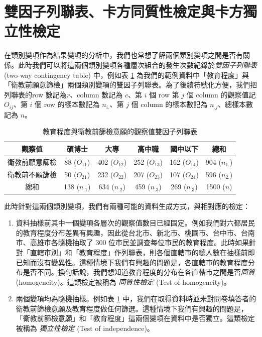 \section{雙因子列聯表、卡方同質性檢定與卡方獨立性檢定}

    在類別變項作為結果變項的分析中，我們也常想了解兩個類別變項之間是否有關係。此時我們可以將這兩個類別變項各種層次組合的發生次數紀錄於\textit{雙因子列聯表} (two-way contingency table) 中，例如表 \ref{tab:two_way_contingency_obs} 為我們的範例資料中「教育程度」與「衛教前願意篩檢」兩個類別變項的雙因子列聯表。為了後續符號化方便，我們把列聯表的row 數記為$r$、column 數記為 $c$、第 $i$ 個 row 第 $j$ 個 column 的觀察值記 $O_{ij}$、第 $i$ 個 row 的樣本數記為 $n_{i.}$、第 $j$ 個 column 的樣本數記為 $n_{.j}$、總樣本數記為 $n$。

    \begin{table}[htbp]
        \begin{center}
            \begin{tabular}{c|cccc|c}
                \toprule
                觀察值 & 碩博士 & 大專 & 高中職 & 國中以下 & 總和\\
                \hline
                衛教前願意篩檢 & 88 ($O_{11}$) & 402 ($O_{12}$) & 252 ($O_{13}$) & 162 ($O_{14}$) & 904 ($n_{1.}$)\\
                衛教前不願篩檢 & 50 ($O_{21}$) & 232 ($O_{22}$) & 207 ($O_{23}$) & 107 ($O_{24}$) & 596 ($n_{2.}$)\\
                \hline
                總和 & 138 ($n_{.1}$) & 634 ($n_{.2}$) & 459 ($n_{.3}$) & 269 ($n_{.3}$) & 1500 ($n$)\\
                \bottomrule
            \end{tabular}
            \caption{教育程度與衛教前篩檢意願的觀察值雙因子列聯表\label{tab:two_way_contingency_obs}}
        \end{center}
    \end{table}
    此時針對這兩個類別變項，我們有兩種可能的資料生成方式，與相對應的檢定：
    \begin{enumerate}
        \item 資料抽樣前其中一個變項各層次的觀察值數目已經固定。例如我們對六都居民的教育程度分布差異有興趣，因此從台北市、新北市、桃園市、台中市、台南市、高雄市各隨機抽取了 300 位市民並調查每位市民的教育程度。此時如果針對「直轄市別」和「教育程度」作列聯表，則各個直轄市的總人數在抽樣前即已知而沒有變異性。這種情境下我們有興趣的問題是，各直轄市的教育程度分布是否不同。換句話說，我們想知道教育程度的分布在各直轄市之間是否\textit{同質} (homogeneity)。這類檢定被稱為 \textit{同質性檢定} (Test of homogeneity)。
        \item 兩個變項均為隨機抽樣。例如表 \ref{tab:two_way_contingency_obs} 中，我們在取得資料時並未對問卷填答者的衛教前篩檢意願及教育程度做任何篩選。這種情境下我們有興趣的問題是，「衛教前篩檢意願」和「教育程度」這兩個變項在資料中是否獨立。這類檢定被稱為 \textit{獨立性檢定} (Test of independence)。
    \end{enumerate}
